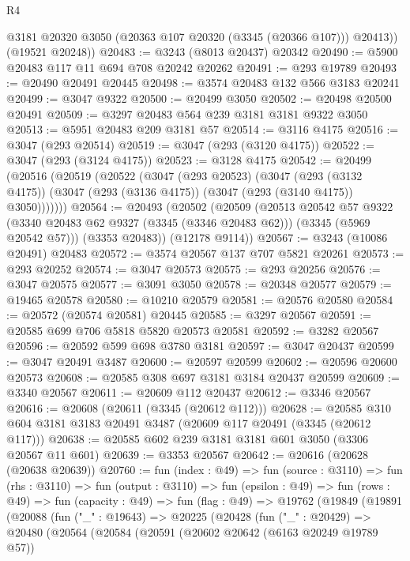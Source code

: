 \begin{lexlean}{R4}
\begin{coremodule}
          @3181
          @20320
          @3050
          (@20363 @107 @20320 (@3345 (@20366 @107)))
          @20413))
      (@19521 @20248))
@20483 := @3243 (@8013 @20437) @20342
@20490 := @5900 @20483 @117 @11 @694 @708 @20242 @20262
@20491 := @293 @19789
@20493 := @20490 @20491 @20445
@20498 := @3574 @20483 @132 @566 @3183 @20241
@20499 := @3047 @9322
@20500 := @20499 @3050
@20502 := @20498 @20500 @20491
@20509 := @3297 @20483 @564 @239 @3181 @3181 @9322 @3050
@20513 := @5951 @20483 @209 @3181 @57
@20514 := @3116 @4175
@20516 := @3047 (@293 @20514)
@20519 := @3047 (@293 (@3120 @4175))
@20522 := @3047 (@293 (@3124 @4175))
@20523 := @3128 @4175
@20542 := @20499
    (@20516
      (@20519
        (@20522
          (@3047
            (@293 @20523)
            (@3047
              (@293 (@3132 @4175))
              (@3047 (@293 (@3136 @4175)) (@3047 (@293 (@3140 @4175)) @3050)))))))
@20564 := @20493
    (@20502
      (@20509
        (@20513
          @20542
          @57
          @9322
          (@3340 @20483 @62 @9327 (@3345 (@3346 @20483 @62)))
          (@3345 (@5969 @20542 @57)))
        (@3353 @20483))
      (@12178 @9114))
@20567 := @3243 (@10086 @20491) @20483
@20572 := @3574 @20567 @137 @707 @5821 @20261
@20573 := @293 @20252
@20574 := @3047 @20573
@20575 := @293 @20256
@20576 := @3047 @20575
@20577 := @3091 @3050
@20578 := @20348 @20577
@20579 := @19465 @20578
@20580 := @10210 @20579
@20581 := @20576 @20580
@20584 := @20572 (@20574 @20581) @20445
@20585 := @3297 @20567
@20591 := @20585 @699 @706 @5818 @5820 @20573 @20581
@20592 := @3282 @20567
@20596 := @20592 @599 @698 @3780 @3181
@20597 := @3047 @20437
@20599 := @3047 @20491 @3487
@20600 := @20597 @20599
@20602 := @20596 @20600 @20573
@20608 := @20585 @308 @697 @3181 @3184 @20437 @20599
@20609 := @3340 @20567
@20611 := @20609 @112 @20437
@20612 := @3346 @20567
@20616 := @20608 (@20611 (@3345 (@20612 @112)))
@20628 := @20585 @310 @604 @3181 @3183 @20491 @3487 (@20609 @117 @20491 (@3345 (@20612 @117)))
@20638 := @20585 @602 @239 @3181 @3181 @601 @3050 (@3306 @20567 @11 @601)
@20639 := @3353 @20567
@20642 := @20616 (@20628 (@20638 @20639))
@20760 := fun (index : @49) =>
  fun (source : @3110) =>
  fun (rhs : @3110) =>
  fun (output : @3110) =>
  fun (epsilon : @49) =>
  fun (rows : @49) =>
  fun (capacity : @49) =>
  fun (flag : @49) =>
  @19762
    (@19849
      (@19891
        (@20088
          (fun ("_" : @19643) =>
          @20225
            (@20428
              (fun ("_" : @20429) =>
              @20480
                (@20564
                  (@20584
                    (@20591
                      (@20602 @20642 (@6163 @20249 @19789 @57))

\end{coremodule}
\end{lexlean}
